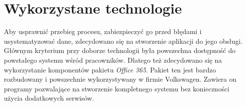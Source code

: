 \section{Wykorzystane technologie}
Aby usprawnić przebieg procesu, zabiezpieczyć go przed błędami i usystematyzować dane, zdecydowano się na stworzenie aplikacji do jego obsługi. Głównym kryterium przy doborze technologii była powszechna dostępność do powstałego systemu wśród pracowników. Dlatego też zdecydowano się na wykorzystanie komponentów pakietu \emph{Office 365}. Pakiet ten jest bardzo rozbudowany i powszechnie wykorzystywany w firmie Volkswagen. Zawiera on programy pozwalające na stworzenie kompletnego systemu bez konieczności użycia dodatkowych serwisów.


